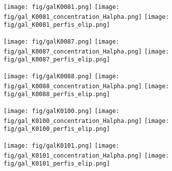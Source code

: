 \begin{figure}[!ht]
\begin{center}
\setcaptionmargin{1cm}
\texttt{[image: fig/galK0081.png]}
\texttt{[image: fig/gal\_K0081\_concentration\_Halpha.png]}
\texttt{[image: fig/gal\_K0081\_perfis\_elip.png]}
\end{center}
\end{figure}


\begin{figure}[!ht]
\begin{center}
\setcaptionmargin{1cm}
\texttt{[image: fig/galK0087.png]}
\texttt{[image: fig/gal\_K0087\_concentration\_Halpha.png]}
\texttt{[image: fig/gal\_K0087\_perfis\_elip.png]}
\end{center}
\end{figure}


\begin{figure}[!ht]
\begin{center}
\setcaptionmargin{1cm}
\texttt{[image: fig/galK0088.png]}
\texttt{[image: fig/gal\_K0088\_concentration\_Halpha.png]}
\texttt{[image: fig/gal\_K0088\_perfis\_elip.png]}
\end{center}
\end{figure}


\begin{figure}[!ht]
\begin{center}
\setcaptionmargin{1cm}
\texttt{[image: fig/galK0100.png]}
\texttt{[image: fig/gal\_K0100\_concentration\_Halpha.png]}
\texttt{[image: fig/gal\_K0100\_perfis\_elip.png]}
\end{center}
\end{figure}


\begin{figure}[!ht]
\begin{center}
\setcaptionmargin{1cm}
\texttt{[image: fig/galK0101.png]}
\texttt{[image: fig/gal\_K0101\_concentration\_Halpha.png]}
\texttt{[image: fig/gal\_K0101\_perfis\_elip.png]}
\end{center}
\end{figure}



